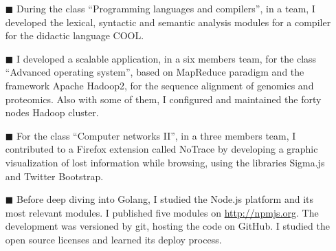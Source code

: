 \documentclass[helvetica,english,logo,notitle,totpages,utf8]{europecv2013}
\begin{document}
\begin{europecv}
{\begin{itemize}
	\item[\color{curious-blue}\tiny$\blacksquare$] During the class “Programming languages and compilers”, in a team, I developed the lexical, syntactic and semantic analysis modules for a compiler for the didactic language COOL.
	\item[\color{curious-blue}\tiny$\blacksquare$] I developed a scalable application, in a six members team, for the class “Advanced operating system”, based on MapReduce paradigm and the framework Apache Hadoop2, for the sequence alignment of genomics and proteomics. Also with some of them, I configured and maintained the forty nodes Hadoop cluster.
	\item[\color{curious-blue}\tiny$\blacksquare$] For the class “Computer networks II”, in a three members team, I contributed to a Firefox extension called NoTrace by developing a graphic visualization of lost information while browsing, using the libraries Sigma.js and Twitter Bootstrap.
	\item[\color{curious-blue}\tiny$\blacksquare$] Before deep diving into Golang, I studied the Node.js platform and its most relevant modules. I published five modules on \url{http://npmjs.org}. The development was versioned by git, hosting the code on GitHub. I studied the open source licenses and learned its deploy process.
\end{itemize}
}








\end{europecv}
\end{document}
